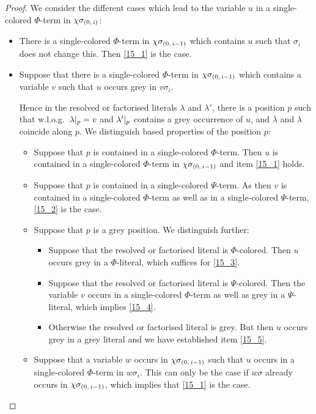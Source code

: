 \documentclass[,%
	draft=false,%
	numbers=noendperiod
	12pt,
	a4paper,
	oneside,%
	openany,
]{memoir}
\newcommand{\inv}{\ensuremath{\chi}}
\begin{document}
\begin{proof}
	We consider the different cases which lead to the variable $u$ in a single-colored $\Phi$-term in $\inv\sigmazi$:

	\begin{itemize}
		\item There is a single-colored $\Phi$-term in $\inv\sigmazmi$ which contains $u$ such that $\sigma_i$ does not change this.
			Then \ref{15_1} is the case.


		\item Suppose that there is a single-colored $\Phi$-term in $\inv\sigmazmi$ which contains a variable $v$ such that $u$ occurs grey in $v\sigma_i$.

			Hence in the resolved or factorised literals $\lambda$ and $\lambda'$, there is a position $p$ such that w.l.o.g.\ $\lambda|_{p} = v$ and $\lambda'|_{p}$ contains a grey occurrence of $u$, and $\lambda$ and $\lambda$ coincide along $p$.
			We distinguish based properties of the position $p$:

			\begin{itemize}
				\item Suppose that $p$ is contained in a single-colored $\Phi$-term.
					Then $u$ is contained in a single-colored $\Phi$-term in $\inv\sigmazmi$ and item \ref{15_1} holds.

				\item Suppose that $p$ is contained in a single-colored $\Psi$-term.
					As then $v$ is contained in a single-colored $\Phi$-term as well as in a single-colored $\Psi$-term, \ref{15_2} is the case.

				\item Suppose that $p$ is a grey position.
					We distinguish further:

					\begin{itemize}
						\item Suppose that the resolved or factorised literal is $\Phi$-colored.
							Then $u$ occurs grey in a $\Phi$-literal, which suffices for \ref{15_3}. 

						\item Suppose that the resolved or factorised literal is $\Psi$-colored.
							Then the variable $v$ occurs in a single-colored $\Phi$-term as well as grey in a $\Psi$-literal, which implies \ref{15_4}.

						\item
							Otherwise the resolved or factorised literal is grey. 
							But then $u$ occurs grey in a grey literal and we have established item \ref{15_5}.
					\end{itemize}


				\item Suppose that a variable $w$ occurs in $\inv\sigmazmi$ such that $u$ occurs in a single-colored $\Phi$-term in $w\sigma_i$.
					This can only be the case if $w\sigma$ already occurs in $\inv\sigmazmi$, which implies that \ref{15_1} is the case.
					\qedhere
			\end{itemize}
	\end{itemize}

\end{proof}
\end{document}
